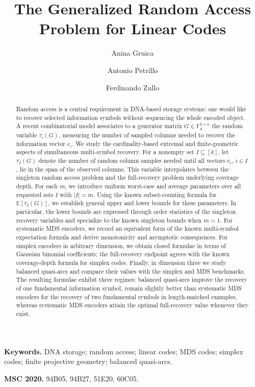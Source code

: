 \documentclass[11pt,a4paper]{article}
\title{The Generalized Random Access Problem for Linear Codes}
\author[1]{Anina Gruica}
\affil[1]{Technical University of Denmark, Denmark}
\author[2]{Antonio Petrillo}
\author[2]{Ferdinando Zullo}
\affil[2]{Universit\`a degli Studi della Campania ``Luigi Vanvitelli'', Italy}
\date{}
\numberwithin{equation}{section}
\theoremstyle{definition}
\theoremstyle{definition}
\newcommand{\F}{\mathbb{F}}
\newcommand{\E}{\mathbb{E}}
\begin{document}
\maketitle

\begin{abstract}
Random access is a central requirement in DNA-based storage systems: one would like to recover selected information symbols without sequencing the whole encoded object.  A recent combinatorial model associates to a generator matrix $G\in \F_q^{k\times n}$ the random variable $\tau_i(G)$, measuring the number of sampled columns needed to recover the information vector $e_i$.  {We study the cardinality-based extremal and finite-geometric aspects of simultaneous multi-symbol recovery.  For a nonempty set $I\subseteq[k]$, let $\tau_I(G)$ denote the number of random column samples needed until all vectors $e_i$, $i\in I$, lie in the span of the observed columns.  This variable interpolates between the singleton random access problem and the full-recovery problem underlying coverage depth.  For each $m$, we introduce uniform worst-case and average parameters over all requested sets $I$ with $|I|=m$.  Using the known subset-counting formula for $\E[\tau_I(G)]$, we establish general upper and lower bounds for these parameters.  In particular, the lower bounds are expressed through order statistics of the singleton recovery variables and specialize to the known singleton bounds when $m=1$.  For systematic MDS encoders, we record an equivalent form of the known multi-symbol expectation formula and derive monotonicity and asymptotic consequences.  For simplex encoders in arbitrary dimension, we obtain closed formulae in terms of Gaussian binomial coefficients; the full-recovery endpoint agrees with the known coverage-depth formula for simplex codes.  Finally, in dimension three we study balanced quasi-arcs and compare their values with the simplex and MDS benchmarks.  The resulting formulae exhibit three regimes: balanced quasi-arcs improve the recovery of one fundamental information symbol, remain slightly better than systematic MDS encoders for the recovery of two fundamental symbols in length-matched examples, whereas systematic MDS encoders attain the optimal full-recovery value whenever they exist.}
\end{abstract}

\medskip
\noindent\textbf{Keywords.} DNA storage; random access; linear codes; MDS codes; simplex codes; finite projective geometry; balanced quasi-arcs.

\medskip
\noindent\textbf{MSC 2020.} 94B05, 94B27, 51E20, 60C05.
\end{document}
